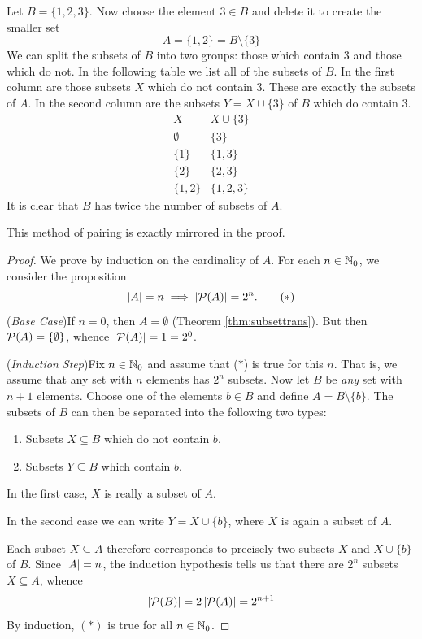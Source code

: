 \begin{example}{}{}
	Let $B=\{1,2,3\}$. Now choose the element $3\in B$ and delete it to create the smaller set
	\[
		A=\{1,2\}=B\setminus\{3\}
	\]
	We can split the subsets of $B$ into two groups: those which contain 3 and those which do not. In the following table we list all of the subsets of $B$. In the first column are those subsets $X$ which do not contain 3. These are exactly the subsets of $A$. In the second column are the subsets $Y=X\cup\{3\}$ of $B$ which do contain 3.
	\[
		\begin{array}{c|c}
			X&X\cup\{3\}\\\hline
			\emptyset&\{3\}\\
			\{1\}&\{1,3\}\\
			\{2\}&\{2,3\}\\
			\{1,2\}&\{1,2,3\}
		\end{array}
	\]
	It is clear that $B$ has twice the number of subsets of $A$.
\end{example}

This method of pairing is exactly mirrored in the proof.

\begin{proof}
	We prove by induction on the cardinality of $A$. For each $n\in\mathbb{N}_0$, we consider the proposition
	\[
		\left| A\right|=n\implies\left| \mathcal{P}(A)\right|=2^n.\tag{$\ast$}
	\]
	(\emph{Base Case})\quad If $n=0$, then $A=\emptyset$ (Theorem \hyperlink{thm:subsettranslnk}{\ref*{thm:subsettrans}}). But then $\mathcal{P}(A)=\{\emptyset\}$, whence $\left| \mathcal{P}(A)\right|=1=2^0$.\par
	(\emph{Induction Step})\quad Fix $n\in\mathbb{N}_0$ and assume that ($\ast$) is true for this $n$. That is, we assume that any set with $n$ elements has $2^n$ subsets. Now let $B$ be \emph{any} set with $n+1$ elements. Choose one of the elements $b\in B$ and define $A=B\setminus\{b\}$. The subsets of $B$ can then be separated into the following two types:
	\begin{enumerate}\itemsep0pt
	  \item Subsets $X\subseteq B$ which do not contain $b$.
	  \item Subsets $Y\subseteq B$ which contain $b$.
	\end{enumerate}
	In the first case, $X$ is really a subset of $A$.\par
	In the second case we can write $Y=X\cup\{b\}$, where $X$ is again a subset of $A$.\par
	Each subset $X\subseteq A$ therefore corresponds to precisely two subsets $X$ and $X\cup\{b\}$ of $B$. Since $\left| A\right|=n$, the induction hypothesis tells us that there are $2^n$ subsets $X\subseteq A$, whence
	\[
		\left| \mathcal{P}(B)\right|=2\left| \mathcal{P}(A)\right|=2^{n+1}
	\]
	By induction, $(\ast)$ is true for all $n\in\mathbb{N}_0$.
\end{proof}

